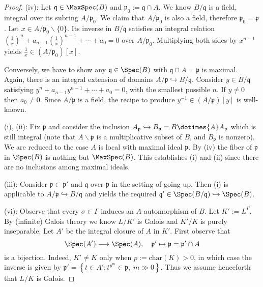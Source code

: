 \begin{proof}
	(iv): Let $\mathfrak{q} \in \MaxSpec(B)$ and $\mathfrak{p}_0 := \mathfrak{q} \cap A$. We know $B/\mathfrak{q}$ is a field, integral over its subring $A/\mathfrak{p}_0$. We claim that $A/\mathfrak{p}_0$ is also a field, therefore $\mathfrak{p}_0 = \mathfrak{p}$. Let $x \in A/\mathfrak{p}_0 \smallsetminus \{0\}$. Its inverse in $B/\mathfrak{q}$ satisfies an integral relation $(\frac{1}{x})^n + a_{n-1} (\frac{1}{x})^{n-1} + \cdots + a_0 = 0$ over $A/\mathfrak{p}_0$. Multiplying both sides by $x^{n-1}$ yields $\frac{1}{x} \in (A/\mathfrak{p}_0)[x]$.
	
	Conversely, we have to show any $\mathfrak{q} \in \Spec(B)$ with $\mathfrak{q} \cap A = \mathfrak{p}$ is maximal. Again, there is an integral extension of domains $A/\mathfrak{p} \hookrightarrow B/\mathfrak{q}$. Consider $y \in B/\mathfrak{q}$ satisfying $y^n + a_{n-1} y^{n-1} + \cdots + a_0 = 0$, with the smallest possible $n$. If $y \neq 0$ then $a_0 \neq 0$. Since $A/\mathfrak{p}$ is a field, the recipe to produce $y^{-1} \in (A/\mathfrak{p})[y]$ is well-known.
	
	(i), (ii): Fix $\mathfrak{p}$ and consider the inclusion $A_{\mathfrak{p}} \hookrightarrow B_{\mathfrak{p}} = B \dotimes{A} A_{\mathfrak{p}}$ which is still integral (note that $A \smallsetminus \mathfrak{p}$ is a multiplicative subset of $B$, and $B_{\mathfrak{p}}$ is nonzero). We are reduced to the case $A$ is local with maximal ideal $\mathfrak{p}$. By (iv) the fiber of $\mathfrak{p}$ in $\Spec(B)$ is nothing but $\MaxSpec(B)$. This establishes (i) and (ii) since there are no inclusions among maximal ideals.
	
	(iii): Consider $\mathfrak{p} \subset \mathfrak{p}'$ and $\mathfrak{q}$ over $\mathfrak{p}$ in the setting of going-up. Then (i) is applicable to $A/\mathfrak{p} \hookrightarrow B/\mathfrak{q}$ and yields the required $\mathfrak{q}' \in \Spec(B/\mathfrak{q}) \hookrightarrow \Spec(B)$.
	
	(vi): Observe that every $\sigma \in \Gamma$ induces an $A$-automorphism of $B$. Let $K' := L^\Gamma$. By (infinite) Galois theory we know $L/K'$ is Galois and $K'/K$ is purely inseparable. Let $A'$ be the integral closure of $A$ in $K'$. First observe that 
	\[ \Spec(A') \longrightarrow \Spec(A), \quad \mathfrak{p}' \mapsto \mathfrak{p} = \mathfrak{p}' \cap A \]
	is a bijection. Indeed, $K' \neq K$ only when $p := \text{char}(K) > 0$, in which case the inverse is given by $\mathfrak{p}' = \left\{t \in A': t^{p^m} \in \mathfrak{p}, \; m \gg 0 \right\}$. Thus we assume henceforth that $L/K$ is Galois.
	

\end{proof}

